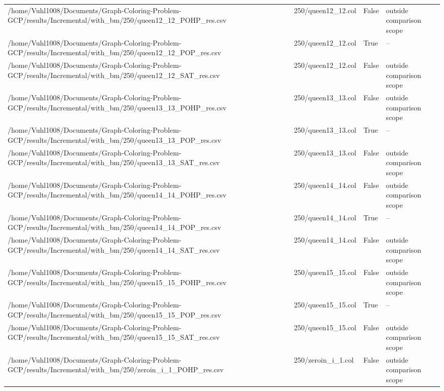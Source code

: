 \begin{table}[htbp]
\begin{tabular}{llll}
/home/Vuhl1008/Documents/Graph-Coloring-Problem-GCP/results/Incremental/with\_bm/250/queen12\_12\_POHP\_res.csv & 250/queen12\_12.col & False & outside comparison scope \\
/home/Vuhl1008/Documents/Graph-Coloring-Problem-GCP/results/Incremental/with\_bm/250/queen12\_12\_POP\_res.csv & 250/queen12\_12.col & True & -- \\
/home/Vuhl1008/Documents/Graph-Coloring-Problem-GCP/results/Incremental/with\_bm/250/queen12\_12\_SAT\_res.csv & 250/queen12\_12.col & False & outside comparison scope \\
/home/Vuhl1008/Documents/Graph-Coloring-Problem-GCP/results/Incremental/with\_bm/250/queen13\_13\_POHP\_res.csv & 250/queen13\_13.col & False & outside comparison scope \\
/home/Vuhl1008/Documents/Graph-Coloring-Problem-GCP/results/Incremental/with\_bm/250/queen13\_13\_POP\_res.csv & 250/queen13\_13.col & True & -- \\
/home/Vuhl1008/Documents/Graph-Coloring-Problem-GCP/results/Incremental/with\_bm/250/queen13\_13\_SAT\_res.csv & 250/queen13\_13.col & False & outside comparison scope \\
/home/Vuhl1008/Documents/Graph-Coloring-Problem-GCP/results/Incremental/with\_bm/250/queen14\_14\_POHP\_res.csv & 250/queen14\_14.col & False & outside comparison scope \\
/home/Vuhl1008/Documents/Graph-Coloring-Problem-GCP/results/Incremental/with\_bm/250/queen14\_14\_POP\_res.csv & 250/queen14\_14.col & True & -- \\
/home/Vuhl1008/Documents/Graph-Coloring-Problem-GCP/results/Incremental/with\_bm/250/queen14\_14\_SAT\_res.csv & 250/queen14\_14.col & False & outside comparison scope \\
/home/Vuhl1008/Documents/Graph-Coloring-Problem-GCP/results/Incremental/with\_bm/250/queen15\_15\_POHP\_res.csv & 250/queen15\_15.col & False & outside comparison scope \\
/home/Vuhl1008/Documents/Graph-Coloring-Problem-GCP/results/Incremental/with\_bm/250/queen15\_15\_POP\_res.csv & 250/queen15\_15.col & True & -- \\
/home/Vuhl1008/Documents/Graph-Coloring-Problem-GCP/results/Incremental/with\_bm/250/queen15\_15\_SAT\_res.csv & 250/queen15\_15.col & False & outside comparison scope \\
/home/Vuhl1008/Documents/Graph-Coloring-Problem-GCP/results/Incremental/with\_bm/250/zeroin\_i\_1\_POHP\_res.csv & 250/zeroin\_i\_1.col & False & outside comparison scope \\

\end{tabular}
\end{table}
